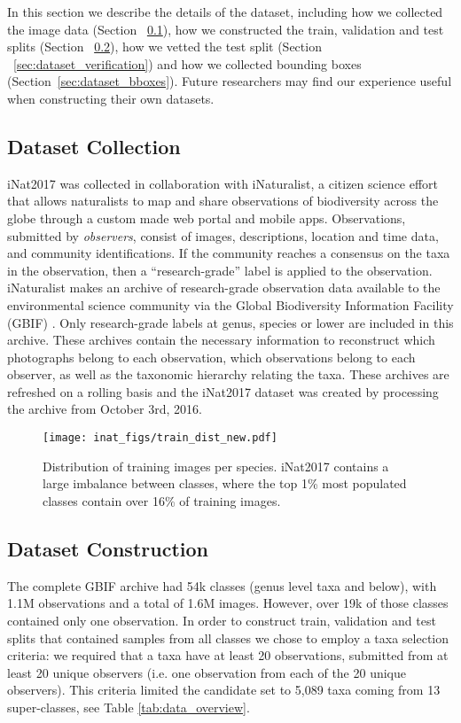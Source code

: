 \documentclass[10pt,twocolumn,letterpaper]{article}
\begin{document}
In this section we describe the details of the dataset, including how we collected the image data (Section ~\ref{sec:dataset_collection}), how we constructed the train, validation and test splits (Section ~\ref{sec:dataset_splits}), how we vetted the test split (Section ~\ref{sec:dataset_verification}) and how we collected bounding boxes (Section~\ref{sec:dataset_bboxes}). Future researchers may find our experience useful when constructing their own datasets.



\subsection{Dataset Collection}
\label{sec:dataset_collection}
iNat2017 was collected in collaboration with iNaturalist, a citizen science effort that allows naturalists to map and share observations of biodiversity across the globe through a custom made web portal and mobile apps. Observations, submitted by \textit{observers}, consist of images, descriptions, location and time data, and community identifications. If the community reaches a consensus on the taxa in the observation, then a ``research-grade'' label is applied to the observation. 
iNaturalist makes an archive of research-grade observation data available to the environmental science community via the Global Biodiversity Information Facility (GBIF) \cite{iNatGBIF}. Only research-grade labels at genus, species or lower are included in this archive. These archives contain the necessary information to reconstruct which photographs belong to each observation, which observations belong to each observer, as well as the taxonomic hierarchy relating the taxa. These archives are refreshed on a rolling basis and the iNat2017 dataset was created by processing the archive from October 3rd, 2016.  


\begin{figure}[t]
\centering
\texttt{[image: inat\_figs/train\_dist\_new.pdf]}
\caption{Distribution of training images per species. iNat2017 contains a large imbalance between classes, where the top 1\% most populated classes contain over 16\% of training images.} 
\label{fig:num_ims}
\end{figure}


\subsection{Dataset Construction}
\label{sec:dataset_splits}
The complete GBIF archive had 54k classes (genus level taxa and below), with 1.1M observations and a total of 1.6M images. However, over 19k of those classes contained only one observation. In order to construct train, validation  and test splits that contained samples from all classes we chose to employ a taxa selection criteria: we required that a taxa have at least 20 observations, submitted from at least 20 unique observers (i.e. one observation from each of the 20 unique observers). This criteria limited the candidate set to 5,089 taxa coming from 13 super-classes, see Table \ref{tab:data_overview}. 
\end{document}
